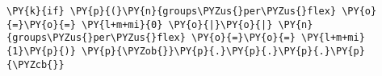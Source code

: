 \begin{Verbatim}[commandchars=\\\{\},codes={\catcode`\$=3\catcode`\^=7\catcode`\_=8}]
\PY{k}{if} \PY{p}{(}\PY{n}{groups\PYZus{}per\PYZus{}flex} \PY{o}{=}\PY{o}{=} \PY{l+m+mi}{0} \PY{o}{|}\PY{o}{|} \PY{n}{groups\PYZus{}per\PYZus{}flex} \PY{o}{=}\PY{o}{=} \PY{l+m+mi}{1}\PY{p}{)} \PY{p}{\PYZob{}}\PY{p}{.}\PY{p}{.}\PY{p}{.}\PY{p}{\PYZcb{}}
\end{Verbatim}

